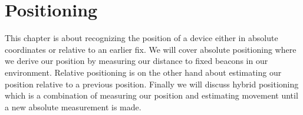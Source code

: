\chapter{Positioning} \label{ch:positioning}

This chapter is about recognizing the position of a device either in absolute coordinates or relative to an earlier fix. We will cover absolute positioning where we derive our position by measuring our distance to fixed beacons in our environment. Relative positioning is on the other hand about estimating our position relative to a previous position. Finally we will discuss hybrid positioning which is a combination of measuring our position and estimating movement until a new absolute measurement is made.





